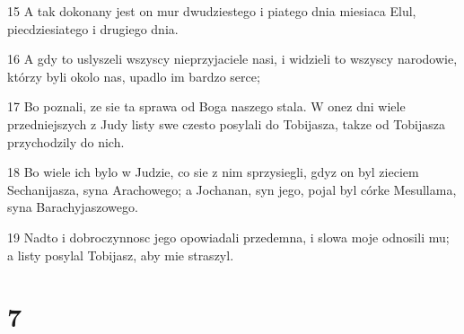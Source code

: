 \par 15 A tak dokonany jest on mur dwudziestego i piatego dnia miesiaca Elul, piecdziesiatego i drugiego dnia.
\par 16 A gdy to uslyszeli wszyscy nieprzyjaciele nasi, i widzieli to wszyscy narodowie, którzy byli okolo nas, upadlo im bardzo serce;
\par 17 Bo poznali, ze sie ta sprawa od Boga naszego stala. W onez dni wiele przedniejszych z Judy listy swe czesto posylali do Tobijasza, takze od Tobijasza przychodzily do nich.
\par 18 Bo wiele ich bylo w Judzie, co sie z nim sprzysiegli, gdyz on byl zieciem Sechanijasza, syna Arachowego; a Jochanan, syn jego, pojal byl córke Mesullama, syna Barachyjaszowego.
\par 19 Nadto i dobroczynnosc jego opowiadali przedemna, i slowa moje odnosili mu; a listy posylal Tobijasz, aby mie straszyl.

\chapter{7}

